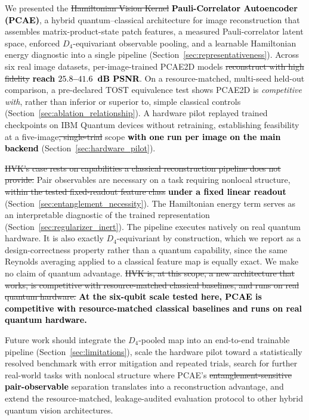 \documentclass[pdflatex,sn-basic]{sn-jnl}
\newcommand{\del}[1]{\sout{#1}}
\newcommand{\add}[1]{\textbf{\textcolor{black}{#1}}}
\begin{document}
We presented the \del{Hamiltonian Vision Kernel} \add{Pauli-Correlator Autoencoder (PCAE)}, a hybrid quantum--classical
architecture for image reconstruction that assembles matrix-product-state patch
features, a measured Pauli-correlator latent space, enforced $D_4$-equivariant
observable pooling, and a learnable Hamiltonian energy diagnostic into a single
pipeline (Section~\ref{sec:representativeness}). Across six real image datasets,
per-image-trained PCAE2D models \del{reconstruct with high fidelity}
\add{reach $25.8$--$41.6$~dB PSNR}. On a
resource-matched, multi-seed held-out comparison, a pre-declared TOST equivalence
test shows PCAE2D is \emph{competitive with}, rather than inferior or superior to,
simple classical controls (Section~\ref{sec:ablation_relationship}). A hardware
pilot replayed trained checkpoints on IBM Quantum devices without retraining,
establishing feasibility at a five-image\del{, single-trial} scope \add{with one run per image on the main backend}
(Section~\ref{sec:hardware_pilot}).

\del{HVK's case rests on capabilities a classical reconstruction pipeline does not
provide.} Pair observables are necessary on a task requiring nonlocal structure,
\del{within the tested fixed-readout feature class} \add{under a fixed linear
readout}
(Section~\ref{sec:entanglement_necessity}). The Hamiltonian energy term serves as
an interpretable diagnostic of the trained representation
(Section~\ref{sec:regularizer_inert}). The pipeline executes natively on real
quantum hardware. It is also exactly $D_4$-equivariant by construction, which we
report as a design-correctness property rather than a quantum capability, since
the same Reynolds averaging applied to a classical feature map is equally exact.
We make no claim of quantum advantage. \del{HVK is, at this scope, a new architecture
that works, is competitive with resource-matched classical baselines, and runs on
real quantum hardware.} \add{At the six-qubit scale tested here, PCAE is
competitive with resource-matched classical baselines and runs on real quantum
hardware.}

Future work should integrate the $D_4$-pooled map into an end-to-end trainable
pipeline (Section~\ref{sec:limitations}), scale the hardware pilot toward a
statistically resolved benchmark with error mitigation and repeated trials,
search for further real-world tasks with nonlocal structure where PCAE's
\del{entanglement-sensitive} \add{pair-observable} separation translates into a reconstruction advantage, and
extend the resource-matched, leakage-audited evaluation protocol to other hybrid
quantum vision architectures.
\end{document}
